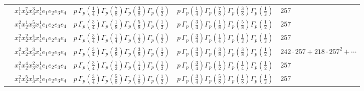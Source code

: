 \documentclass[11pt]{article}
\begin{document}
\begin{table}[ht]
{\begin{tabular}{@{}lllll@{}}
 & $x_{1}^{1} x_{2}^{7} x_{3}^{3} x_{4}^{1}  e_{1} e_{2} e_{3} e_{4}$ & $p \, \Gamma_p \left( \frac{1}{4} \right) \Gamma_p \left( \frac{7}{8} \right) \Gamma_p \left( \frac{3}{8} \right) \Gamma_p \left( \frac{1}{2} \right)$ & $p \, \Gamma_p \left( \frac{1}{4} \right) \Gamma_p \left( \frac{7}{8} \right) \Gamma_p \left( \frac{3}{8} \right) \Gamma_p \left( \frac{1}{2} \right)$ & $257$ \\
 & $x_{1}^{2} x_{2}^{1} x_{3}^{5} x_{4}^{1}  e_{1} e_{2} e_{3} e_{4}$ & $p \, \Gamma_p \left( \frac{3}{4} \right) \Gamma_p \left( \frac{1}{8} \right) \Gamma_p \left( \frac{5}{8} \right) \Gamma_p \left( \frac{1}{2} \right)$ & $p \, \Gamma_p \left( \frac{3}{4} \right) \Gamma_p \left( \frac{1}{8} \right) \Gamma_p \left( \frac{5}{8} \right) \Gamma_p \left( \frac{1}{2} \right)$ & $257$ \\
 & $x_{1}^{2} x_{2}^{2} x_{3}^{4} x_{4}^{1}  e_{1} e_{2} e_{3} e_{4}$ & $p \, \Gamma_p \left( \frac{3}{4} \right) \Gamma_p \left( \frac{1}{4} \right) \Gamma_p \left( \frac{1}{2} \right) \Gamma_p \left( \frac{1}{2} \right)$ & $p \, \Gamma_p \left( \frac{3}{4} \right) \Gamma_p \left( \frac{1}{4} \right) \Gamma_p \left( \frac{1}{2} \right) \Gamma_p \left( \frac{1}{2} \right)$ & $257$ \\
 & $x_{1}^{2} x_{2}^{3} x_{3}^{3} x_{4}^{1}  e_{1} e_{2} e_{3} e_{4}$ & $p \, \Gamma_p \left( \frac{3}{4} \right) \Gamma_p \left( \frac{3}{8} \right) \Gamma_p \left( \frac{3}{8} \right) \Gamma_p \left( \frac{1}{2} \right)$ & $p \, \Gamma_p \left( \frac{3}{4} \right) \Gamma_p \left( \frac{3}{8} \right) \Gamma_p \left( \frac{3}{8} \right) \Gamma_p \left( \frac{1}{2} \right)$ & $242{\cdot}257{+}218{\cdot}257^{2}{+}\cdots$ \\
 & $x_{1}^{2} x_{2}^{4} x_{3}^{2} x_{4}^{1}  e_{1} e_{2} e_{3} e_{4}$ & $p \, \Gamma_p \left( \frac{3}{4} \right) \Gamma_p \left( \frac{1}{2} \right) \Gamma_p \left( \frac{1}{4} \right) \Gamma_p \left( \frac{1}{2} \right)$ & $p \, \Gamma_p \left( \frac{3}{4} \right) \Gamma_p \left( \frac{1}{2} \right) \Gamma_p \left( \frac{1}{4} \right) \Gamma_p \left( \frac{1}{2} \right)$ & $257$ \\
 & $x_{1}^{2} x_{2}^{5} x_{3}^{1} x_{4}^{1}  e_{1} e_{2} e_{3} e_{4}$ & $p \, \Gamma_p \left( \frac{3}{4} \right) \Gamma_p \left( \frac{5}{8} \right) \Gamma_p \left( \frac{1}{8} \right) \Gamma_p \left( \frac{1}{2} \right)$ & $p \, \Gamma_p \left( \frac{3}{4} \right) \Gamma_p \left( \frac{5}{8} \right) \Gamma_p \left( \frac{1}{8} \right) \Gamma_p \left( \frac{1}{2} \right)$ & $257$ \\

\end{tabular}}
\end{table}
\end{document}
